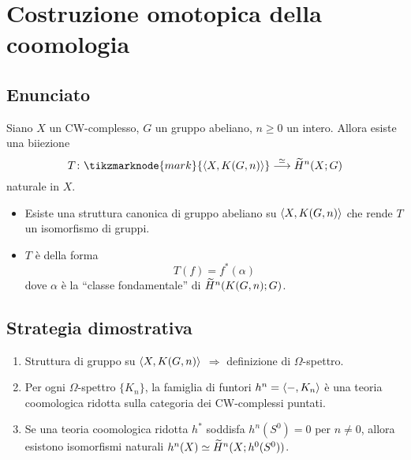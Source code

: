 \documentclass[9pt]{beamer}
\begin{document}
\newcommand*{\statemainresult}{%
\begin{theorem}
Siano $X$ un CW-complesso, $G$ un gruppo abeliano, $n\ge 0$ un intero. Allora esiste una biiezione
\[
\map[\iso]{T}{\tikzmarknode{mark}{\hmaps{X,K(G,n)}}}{\til{H}^n(X;G)}
\]
naturale in $X$.
\end{theorem}
}
\section*{Costruzione omotopica della coomologia}
\subsection*{Enunciato}
\begin{frame*}
\statemainresult%
\pause\pause
\begin{itemize}[<+->]
\item Esiste una struttura canonica di gruppo abeliano su $\langle X,K(G,n)\rangle$ che rende $T$ un isomorfismo di gruppi.
\item $T$ è della forma
\[
T(f)=f^*(\alpha)
\]
dove $\alpha$ è la ``classe fondamentale'' di $\widetilde{H}^n(K(G,n);G)$.
\end{itemize}
\end{frame*}

\subsection*{Strategia dimostrativa}
\begin{frame*}
\begin{enumerate}[<+->]
\addtolength\itemsep{1em}
\item Struttura di gruppo su $\langle X,K(G,n)\rangle$ $\Longrightarrow$ definizione di $\Omega$-spettro.
\item Per ogni $\Omega$-spettro $\{K_n\}$, la famiglia di funtori $h^n=\langle -,K_n\rangle$ è una teoria coomologica ridotta sulla categoria dei CW-complessi puntati.
\item Se una teoria coomologica ridotta $h^*$ soddisfa $h^n(S^0)=0$ per $n\neq 0$, allora esistono isomorfismi naturali $h^n(X)\simeq\widetilde{H}^n(X;h^0(S^0))$.
\end{enumerate}
\end{frame*}

%

%
\end{document}
